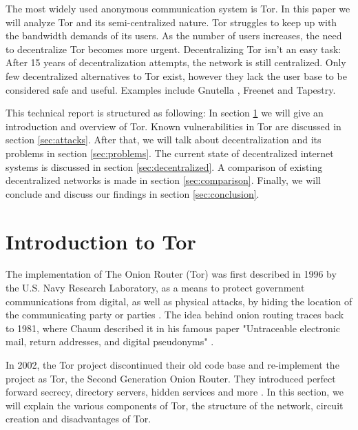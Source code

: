 \documentclass{article}
\begin{document}
	The most widely used anonymous communication system is Tor. In this paper we will analyze Tor and its semi-centralized nature. Tor struggles to keep up with the bandwidth demands of its users. As the number of users increases, the need to decentralize Tor becomes more urgent. Decentralizing Tor isn't an easy task: After 15 years of decentralization attempts, the network is still centralized. Only few decentralized alternatives to Tor exist, however they lack the user base to be considered safe and useful. Examples include Gnutella \cite{ripeanu2001peer}, Freenet \cite{lua2005survey} and Tapestry.
	
	This technical report is structured as following: In section \ref{sec:tor} we will give an introduction and overview of Tor. Known vulnerabilities in Tor are discussed in section \ref{sec:attacks}. After that, we will talk about decentralization and its problems in section \ref{sec:problems}. The current state of decentralized internet systems is discussed in section \ref{sec:decentralized}. A comparison of existing decentralized networks is made in section \ref{sec:comparison}. Finally, we will conclude and discuss our findings in section \ref{sec:conclusion}.
	
\section{Introduction to Tor}
	\label{sec:tor}
	
	The implementation of The Onion Router (Tor) was first described in 1996 by the U.S. Navy Research Laboratory, as a means to protect government communications from digital, as well as physical attacks, by hiding the location of the communicating party or parties \cite{goldschlag1996hiding}. The idea behind onion routing traces back to 1981, where Chaum described it in his famous paper "Untraceable electronic mail, return addresses, and digital pseudonyms" \cite{chaum1981untraceable}.
	
	In 2002, the Tor project discontinued their old code base and re-implement the project as Tor, the Second Generation Onion Router. They introduced perfect forward secrecy, directory servers, hidden services and more \cite{dingledine2004tor}. In this section, we will explain the various components of Tor, the structure of the network, circuit creation and disadvantages of Tor.
	
\end{document}

